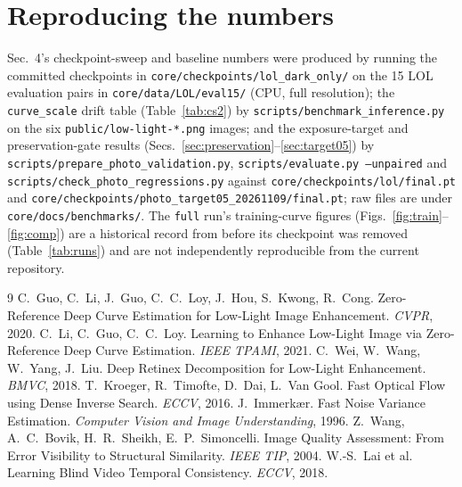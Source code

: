 \documentclass{article}
\newcommand{\code}[1]{\texttt{#1}}
\begin{document}
\section*{Reproducing the numbers}
Sec.~4's checkpoint-sweep and baseline numbers were produced by running the committed checkpoints in \code{core/checkpoints/lol\_dark\_only/} on the 15 LOL evaluation pairs in \code{core/data/LOL/eval15/} (CPU, full resolution); the \code{curve\_scale} drift table (Table~\ref{tab:cs2}) by \code{scripts/benchmark\_inference.py} on the six \code{public/low-light-*.png} images; and the exposure-target and preservation-gate results (Secs.~\ref{sec:preservation}--\ref{sec:target05}) by \code{scripts/prepare\_photo\_validation.py}, \code{scripts/evaluate.py --unpaired} and \code{scripts/check\_photo\_regressions.py} against \code{core/checkpoints/lol/final.pt} and \code{core/checkpoints/photo\_target05\_20261109/final.pt}; raw files are under \code{core/docs/benchmarks/}. The \code{full} run's training-curve figures (Figs.~\ref{fig:train}--\ref{fig:comp}) are a historical record from before its checkpoint was removed (Table~\ref{tab:runs}) and are not independently reproducible from the current repository.

\begin{thebibliography}{9}
 C.~Guo, C.~Li, J.~Guo, C.~C.~Loy, J.~Hou, S.~Kwong, R.~Cong. Zero-Reference Deep Curve Estimation for Low-Light Image Enhancement. \emph{CVPR}, 2020.
 C.~Li, C.~Guo, C.~C.~Loy. Learning to Enhance Low-Light Image via Zero-Reference Deep Curve Estimation. \emph{IEEE TPAMI}, 2021.
 C.~Wei, W.~Wang, W.~Yang, J.~Liu. Deep Retinex Decomposition for Low-Light Enhancement. \emph{BMVC}, 2018.
 T.~Kroeger, R.~Timofte, D.~Dai, L.~Van Gool. Fast Optical Flow using Dense Inverse Search. \emph{ECCV}, 2016.
 J.~Immerk{\ae}r. Fast Noise Variance Estimation. \emph{Computer Vision and Image Understanding}, 1996.
 Z.~Wang, A.~C.~Bovik, H.~R.~Sheikh, E.~P.~Simoncelli. Image Quality Assessment: From Error Visibility to Structural Similarity. \emph{IEEE TIP}, 2004.
 W.-S.~Lai et al. Learning Blind Video Temporal Consistency. \emph{ECCV}, 2018.
\end{thebibliography}

\appendix
\end{document}
